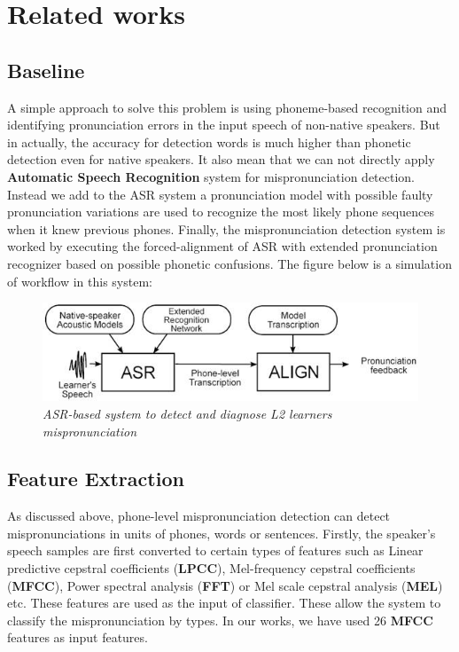 \documentclass[conference]{IEEEtran}
\begin{document}
\section{Related works}

\subsection{Baseline}

A simple approach to solve this problem is using phoneme-based recognition and identifying pronunciation errors in the input speech of non-native speakers. But in actually, the accuracy for detection words is much higher than phonetic detection even for native speakers. It also mean that we can not directly apply  \textbf{Automatic Speech Recognition} system for mispronunciation detection. Instead we add to the ASR system a pronunciation model with possible faulty pronunciation variations are used to recognize the most likely phone sequences when it knew previous phones. Finally, the mispronunciation detection system is worked by executing the forced-alignment of ASR with extended pronunciation recognizer based on possible phonetic confusions. The figure below is a simulation of workflow in this system:

\begin{figure}[h]
\includegraphics[scale=0.6]{baseline.jpg}
\centering
\caption{\textit{ASR-based system to detect and diagnose L2 learners mispronunciation}}
\end{figure}

\subsection{Feature Extraction}
As discussed above, phone-level mispronunciation detection can detect mispronunciations in units of phones, words or sentences. Firstly, the speaker's speech samples are first converted to certain types of features such as Linear predictive cepstral coefficients (\textbf{LPCC}), Mel-frequency cepstral coefficients (\textbf{MFCC}), Power spectral analysis (\textbf{FFT}) or Mel scale cepstral analysis (\textbf{MEL}) etc. These features are used as the input of classifier. These allow the system to classify the mispronunciation by types. In our works, we have used 26 \textbf{MFCC} features as input features.
\end{document}
